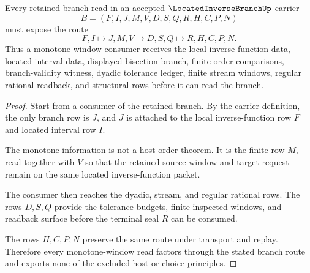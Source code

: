\begin{theorem}
\label{thm:located-inverse-branch-monotone-window}
Every retained branch read in an accepted $\LocatedInverseBranchUp$ carrier
$$
B=(F,I,J,M,V,D,S,Q,R,H,C,P,N)
$$
must expose the route
$$
F,I \longmapsto J,M,V \longmapsto D,S,Q \longmapsto R,H,C,P,N .
$$
Thus a monotone-window consumer receives the local inverse-function data, located interval data, displayed bisection branch, finite order comparisons, branch-validity witness, dyadic tolerance ledger, finite stream windows, regular rational readback, and structural rows before it can read the branch.
\end{theorem}
\begin{proof}
Start from a consumer of the retained branch. By the carrier definition, the only branch row is $J$, and $J$ is attached to the local inverse-function row $F$ and located interval row $I$.

The monotone information is not a host order theorem. It is the finite row $M$, read together with $V$ so that the retained source window and target request remain on the same located inverse-function packet.

The consumer then reaches the dyadic, stream, and regular rational rows. The rows $D,S,Q$ provide the tolerance budgets, finite inspected windows, and readback surface before the terminal seal $R$ can be consumed.

The rows $H,C,P,N$ preserve the same route under transport and replay. Therefore every monotone-window read factors through the stated branch route and exports none of the excluded host or choice principles.
\end{proof}

